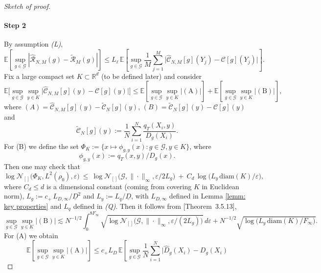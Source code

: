 \documentclass[11pt]{article}
\theoremstyle{remark}
\numberwithin{equation}{section}
\newcommand{\E}{\mathbb{E}}
\def\cmax{c_{+}}
\begin{document}
\begin{proof}[Sketch of proof]
\paragraph{Step 2} By assumption \emph{(L)}, 
\[
\E[\sup_{g 
\in \mathcal G} |\widehat{\mathcal{R}}_{N,M}(g) - \widetilde{\mathcal{R}}_M(g)|]
  \le
  L_\ell\,
  \E
  \left[
    \sup_{g\in\mathcal{G}}
      \frac{1}{M}\sum_{j=1}^M
        \bigl|
          \widehat{\mathcal{C}}_{N,M}[g](Y_j) - \mathcal{C}[g](Y_j)
        \bigr|
  \right].
\]
Fix a large compact set $K\subset\mathbb{R}^d$ (to be defined later) and consider 
\[\E
  \bigl[
    \sup_{g\in\mathcal{G}}\sup_{y\in K}
      \bigl|
        \widehat{\mathcal{C}}_{N,M}[g](y) - \mathcal{C}[g](y)
      \bigr|
  \bigr] \le \E[\sup_{g\in\mathcal{G}}\sup_{y\in K}|(\mathrm{A})|]
  +
  \E[\sup_{g\in\mathcal{G}}\sup_{y\in K}|(\mathrm{B})|],
\]
where $(A) = \widehat{\mathcal{C}}_{N,M}[g](y) 
      - \widetilde{\mathcal{C}}_{N}[g](y)$, $(B) = \widetilde{\mathcal{C}}_{N}[g](y) - \mathcal{C}[g](y)$ and 
      $$
  \widetilde{\mathcal{C}}_{N}[g](y)
  :=
  \frac{1}{N}\sum_{i=1}^N
     \frac{q_T(X_i,y)}{D_g(X_i)}.
      $$
      For (B) we define the set $\Phi_K
  := \{
    x\mapsto \phi_{g,y}(x)
   : g\in\mathcal{G}, y\in K\}$, where 
   $$\phi_{g,y}(x)
  := q_T(x,y)/D_g(x).
  $$ 
  Then one may check that
\begin{equation*}
  \log \mathcal N_{[]}\!\big(\Phi_K,L^2(\rho_0), \varepsilon\big)
  \ \le\
  \log \mathcal N_{[]}\!\Big(\mathcal G,\|\cdot\|_\infty, \varepsilon/2L_g\Big)
  \ +\
  C_d\,\log\!\Big(L_y\,\mathrm{diam}(K)/\varepsilon \Big),
\end{equation*}
where $C_d\le d$ is a dimensional constant (coming from covering $K$ in Euclidean norm), $L_g:=c_+\,L_{D,\infty}/\underline D^{2}$ and $L_y:=L_q/\underline D$, with $L_{D,\infty}$ defined in Lemma \ref{lemm: key properties} and $L_q$ defined in \emph{(Q)}.  
Then it follows from  \cite{GineNickl2016}[Theorem~3.5.13], 
\begin{equation*}
  \sup_{g\in\mathcal{G}}\sup_{y\in K}|(\mathrm{B})|
   \lesssim N^{-1/2} \int_{0}^{8 F_{\infty}} \sqrt{\log \mathcal N_{[]}\!\Big(\mathcal G,\|\cdot\|_\infty,\varepsilon/(2L_g)\Big)} \, d\varepsilon +N^{-1/2} \sqrt{\log\!\Big({L_y\,\mathrm{diam}(K)/F_\infty \Big)} }.
\end{equation*}
For (A) we obtain 
\[
  \E
  \left[
    \sup_{g\in\mathcal{G}}\sup_{y\in K}|(\mathrm{A})|
  \right]
  \le
  \cmax L_D\,
  \mathbb{E}
  \left[
    \sup_{g\in\mathcal{G}}
      \frac{1}{N}\sum_{i=1}^N
        \bigl|
          \widehat{D}_g(X_i) - D_g(X_i)
\]
\end{proof}
\end{document}
